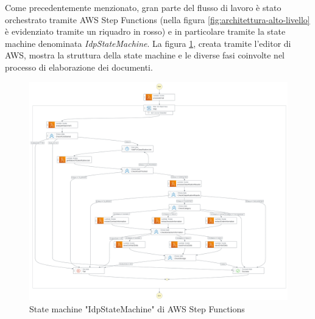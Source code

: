 Come precedentemente menzionato, gran parte del flusso di lavoro è stato orchestrato tramite AWS Step Functions (nella figura \ref{fig:architettura-alto-livello} è evidenziato tramite un riquadro in rosso) e in particolare tramite la state machine denominata \emph{IdpStateMachine}. La figura \ref{fig:IDP_state_machine}, creata tramite l'editor di AWS, mostra la struttura della state machine e le diverse fasi coinvolte nel processo di elaborazione dei documenti.   
\begin{figure}[p]
    \centering
    \includegraphics[width=1.1\textwidth, height=0.9\textheight]{img/design/IdpStateMachine.png}
    \caption{State machine "IdpStateMachine" di AWS Step Functions}
    \label{fig:IDP_state_machine}
\end{figure}
